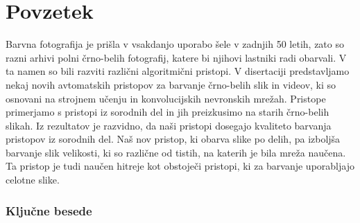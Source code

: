 \chapter*{Povzetek}


Barvna fotografija je prišla v vsakdanjo uporabo šele v zadnjih 50 letih, zato so razni arhivi polni črno-belih fotografij, katere bi njihovi lastniki radi obarvali. V ta namen so bili razviti različni algoritmični pristopi.
V disertaciji predstavljamo nekaj novih avtomatskih pristopov za barvanje črno-belih slik in videov, ki so osnovani na strojnem učenju in konvolucijskih nevronskih mrežah. Pristope primerjamo s pristopi iz sorodnih del in jih preizkusimo na starih črno-belih slikah. 
Iz rezultatov je razvidno, da naši pristopi dosegajo kvaliteto barvanja pristopov iz sorodnih del. Naš nov pristop, ki obarva slike po delih, pa izboljša barvanje slik velikosti, ki so različne od tistih, na katerih je bila mreža naučena. Ta pristop je tudi naučen hitreje kot obstoječi pristopi, ki za barvanje uporabljajo celotne slike. 

\subsection*{Ključne besede}
\textit{\tkeywords}
\clearemptydoublepage